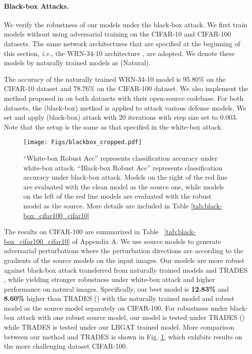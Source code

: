 \documentclass[10pt,twocolumn,letterpaper]{article}
\begin{document}
\paragraph{Black-box Attacks.}
We verify the robustness of our models under the black-box attack. We first train models without using adversarial training on the CIFAR-10 and CIFAR-100 datasets. The same network architectures that are specified at the beginning of this section, {\it i.e.}, the WRN-34-10 architecture \cite{DBLP:conf/bmvc/ZagoruykoK16}, are adopted. We denote these models by naturally trained models as (Natural). 

The accuracy of the naturally trained WRN-34-10 model is 95.80\% on the CIFAR-10 dataset and 78.76\% on the CIFAR-100 dataset. We also implement the method proposed in \cite{zhang2019theoretically} on both datasets with their open-source codebase. For both datasets, the  (black-box) method is applied to attack various defense models. We set  and apply  (black-box) attack with 20 iterations with step size set to 0.003. Note that the setup is the same as that specified in the white-box attack.

\begin{figure}[t]
	\begin{center}
		\texttt{[image: Figs/blackbox\_cropped.pdf]}
		\caption{``White-box Robust Acc'' represents classification accuracy under white-box attack. ``Black-box Robust Acc'' represents classification accuracy under black-box attack. Models on the right of the red line are evaluated with the clean model as the source one, while models on the left of the red line models are evaluated with the robust model as the source. More details are included in Table \ref{tab:black-box_cifar100_cifar10}}
		\label{fig:blackbox}
	\end{center}
\vspace{-0.1in}
\end{figure}

The results on CIFAR-100 are summarized in Table ~\ref{tab:black-box_cifar100_cifar10} of Appendix A. We use source models to generate adversarial perturbations where the perturbation directions are according to the gradients of the source models on the input images. Our models are more robust against black-box attack transferred from naturally trained models and TRADES \cite{zhang2019theoretically}, while yielding stronger robustness under white-box attack and higher performance on natural images. Specifically, our best model is \textbf{12.83\%} and \textbf{8.60\%} higher than TRADES () with the naturally trained model and robust model as the source model separately on CIFAR-100. For robustness under black-box attack with one robust source model, our model is tested under TRADES () while TRADES is tested under our LBGAT trained model. More comparison between our method and TRADES is shown in Fig. \ref{fig:blackbox}, which exhibits results on the more challenging dataset CIFAR-100.
\end{document}
